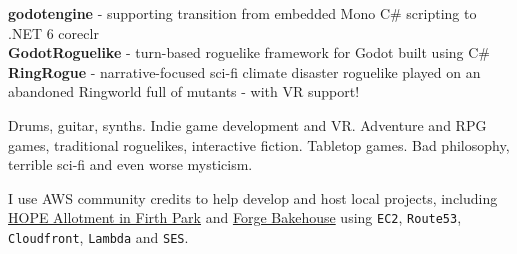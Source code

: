 \documentclass[9pt]{developercv} %
\begin{document}

\begin{minipage}[t]{0.4\textwidth}
	\vspace{-\baselineskip} %

	
	\textbf{godotengine} - supporting transition from embedded Mono C\# scripting to .NET 6 coreclr\\
	\textbf{GodotRoguelike} - turn-based roguelike framework for Godot built using C\#\\
	\textbf{RingRogue} - narrative-focused sci-fi climate disaster roguelike played on an abandoned Ringworld full of mutants - with VR support!\\

\end{minipage}
\hfill
\begin{minipage}[t]{0.25\textwidth}
	\vspace{-\baselineskip} %
	
	
	Drums, guitar, synths. Indie game development and VR. Adventure and RPG games, traditional roguelikes, interactive fiction. Tabletop games. Bad philosophy, terrible sci-fi and even worse mysticism.
\end{minipage}
\hfill
\begin{minipage}[t]{0.25\textwidth}
	\vspace{-\baselineskip} %
	
	
	I use AWS community credits to help develop and host local projects, including \href{https://hopeallotment.org.uk/}{HOPE Allotment in Firth Park} and \href{https://forgebakehouse.co.uk/}{Forge Bakehouse} using \texttt{EC2}, \texttt{Route53}, \texttt{Cloudfront}, \texttt{Lambda} and \texttt{SES}.
\end{minipage}

\end{document}
